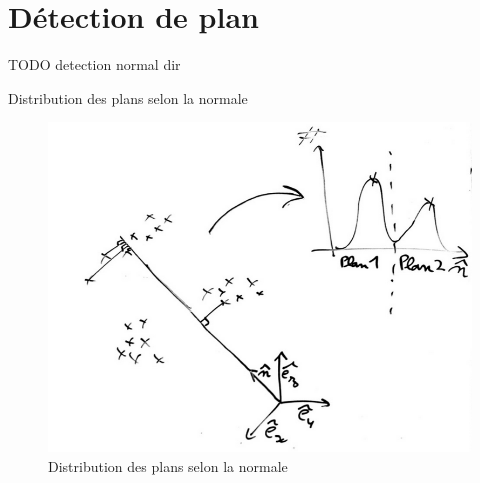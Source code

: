 \documentclass[11pt]{beamer}
\begin{document}
\section{Détection de plan}
\begin{frame}{TODO}
detection normal dir
\end{frame}


\begin{frame}{}
\begin{multicols}{2}

\columnbreak

\end{multicols}
\end{frame}


\begin{frame}{Distribution des plans selon la normale}

\begin{figure}[hbtp]
\centering
\includegraphics[width=.7\textwidth]{normal_to_hist.png}
\caption{Distribution des plans selon la normale}
\end{figure}
\end{frame}
\end{document}
